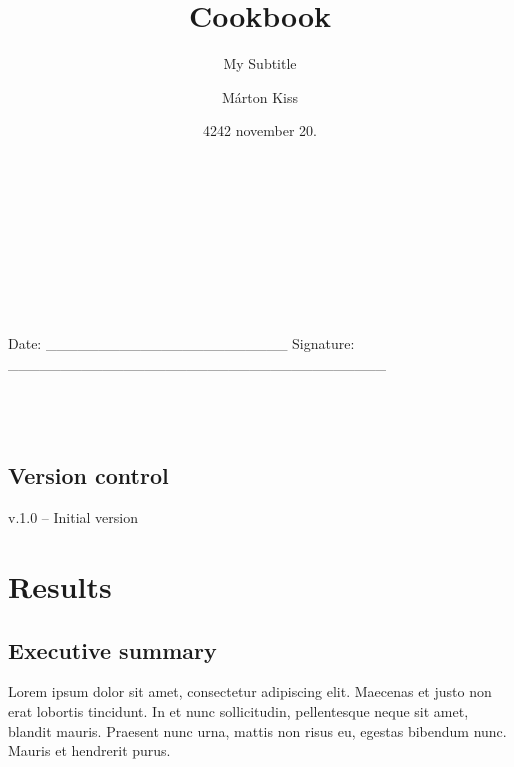\documentclass[
]{article}
\title{Cookbook}
\subtitle{My Subtitle}
\author{Márton Kiss}
\date{4242 november 20.}
\begin{document}
\maketitle

{
\setcounter{tocdepth}{3}
\tableofcontents
}
\(~\)\\
\(~\)\\
\(~\)\\
\(~\)\\
\(~\)\\
\(~\)\\
\(~\)\\
Date: \_\_\_\_\_\_\_\_\_\_\_\_\_\_\_\_\_\_\_\_\_\_\_ Signature:
\_\_\_\_\_\_\_\_\_\_\_\_\_\_\_\_\_\_\_\_\_\_\_\_\_\_\_\_\_\_\_\_\_\_\_\_
\(~\)\\
\(~\)\\
\(~\)\\
\(~\)\\

\hypertarget{version-control}{%
\subsection*{Version control}\label{version-control}}

v.1.0 -- Initial version

\newpage

\listoffigures
\listoftables
\pagebreak

\hypertarget{results}{%
\section{Results}\label{results}}

\renewcommand\floatpagefraction{0.8}

\graphicspath{ {../figures} {../inst/cookbook_files/figure-latex/} {../figure-latex/} {../inst/01_chap1_files/figure-latex/}}

\hypertarget{executive-summary}{%
\subsection{Executive summary}\label{executive-summary}}

Lorem ipsum dolor sit amet, consectetur adipiscing elit. Maecenas et
justo non erat lobortis tincidunt. In et nunc sollicitudin, pellentesque
neque sit amet, blandit mauris. Praesent nunc urna, mattis non risus eu,
egestas bibendum nunc. Mauris et hendrerit purus.
\end{document}
